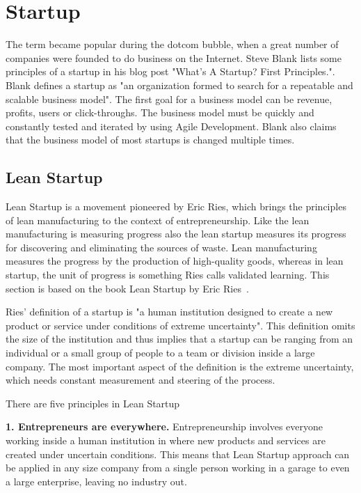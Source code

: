 
 \section{Startup}
\label{sec:startup}

The term became popular during the dotcom bubble, when a great number of companies were founded to do business on the Internet. Steve Blank lists some principles of a startup in his blog post "What’s A Startup? First Principles.". Blank defines a startup as "an organization formed to search for a repeatable and scalable business model". The first goal for a business model can be revenue, profits, users or click-throughs. The business model must be quickly and constantly tested and iterated by using Agile Development. Blank also claims that the business model of most startups is changed multiple times.~\cite{blank2010startup}

 \subsection{Lean Startup}
 
Lean Startup is a movement pioneered by Eric Ries, which brings the principles of lean manufacturing to the context of entrepreneurship. Like the lean manufacturing is measuring progress also the lean startup measures its progress for discovering and eliminating the sources of waste. Lean manufacturing measures the progress by the production of high-quality goods, whereas in lean startup, the unit of progress is something Ries calls validated learning. This section is based on the book Lean Startup by Eric Ries~\cite{ries2011lean}.

Ries' definition of a startup is "a human institution designed to create a new product or service under conditions of extreme uncertainty". This definition omits the size of the institution and thus implies that a startup can be ranging from an individual or a small group of people to a team or division inside a large company. The most important aspect of the definition is the extreme uncertainty, which needs constant measurement and steering of the process.

There are five principles in Lean Startup


\textbf{1. Entrepreneurs are everywhere.} Entrepreneurship involves everyone working inside a human institution in where new products and services are created under uncertain conditions. This means that Lean Startup approach can be applied in any size company from a single person working in a garage to even a large enterprise, leaving no industry out.

